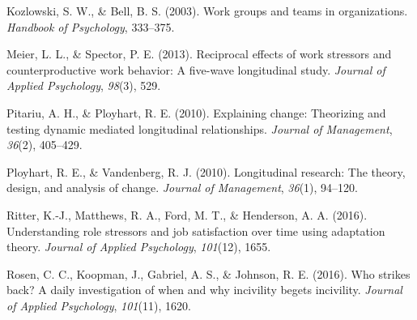 \documentclass[english,,man]{apa6}
\theoremstyle{definition}
\theoremstyle{definition}
\theoremstyle{definition}
\theoremstyle{remark}
\begin{document}
\leavevmode\hypertarget{ref-kozlowski_work_2003}{}%
Kozlowski, S. W., \& Bell, B. S. (2003). Work groups and teams in
organizations. \emph{Handbook of Psychology}, 333--375.

\leavevmode\hypertarget{ref-meier_reciprocal_2013}{}%
Meier, L. L., \& Spector, P. E. (2013). Reciprocal effects of work
stressors and counterproductive work behavior: A five-wave longitudinal
study. \emph{Journal of Applied Psychology}, \emph{98}(3), 529.

\leavevmode\hypertarget{ref-pitariu_explaining_2010}{}%
Pitariu, A. H., \& Ployhart, R. E. (2010). Explaining change: Theorizing
and testing dynamic mediated longitudinal relationships. \emph{Journal
of Management}, \emph{36}(2), 405--429.

\leavevmode\hypertarget{ref-ployhart_longitudinal_2010}{}%
Ployhart, R. E., \& Vandenberg, R. J. (2010). Longitudinal research: The
theory, design, and analysis of change. \emph{Journal of Management},
\emph{36}(1), 94--120.

\leavevmode\hypertarget{ref-ritter_understanding_2016}{}%
Ritter, K.-J., Matthews, R. A., Ford, M. T., \& Henderson, A. A. (2016).
Understanding role stressors and job satisfaction over time using
adaptation theory. \emph{Journal of Applied Psychology}, \emph{101}(12),
1655.

\leavevmode\hypertarget{ref-rosen_who_2016}{}%
Rosen, C. C., Koopman, J., Gabriel, A. S., \& Johnson, R. E. (2016). Who
strikes back? A daily investigation of when and why incivility begets
incivility. \emph{Journal of Applied Psychology}, \emph{101}(11), 1620.
\end{document}
